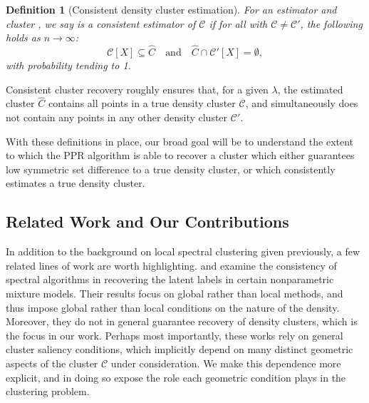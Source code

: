 \documentclass[11pt,twoside]{article}
\newtheorem{definition}{Definition}
\newcommand{\1}{\mathbf{1}}
\newcommand{\Xbf}{X}             %
\newcommand{\Cbb}{\mathbb{C}}
\newcommand{\Cset}{\mathcal{C}}
\newcommand{\Cest}{\widehat{C}}
\begin{document}
\begin{definition}[Consistent density cluster estimation]
  \label{def: consistent_density_cluster_estimation}
  For an estimator \smash{$\Cest \subseteq \Xbf$} and cluster 
  \smash{$\Cset \in \Cbb_f(\lambda)$}, we say \smash{$\Cest$} is a consistent 
  estimator of $\Cset$ if for all \smash{$\Cset' \in \Cbb_f(\lambda)$} with
  $\Cset \not= \Cset'$, the following holds as $n \to \infty$: 
  \begin{equation}
    \label{eqn: consistent_density_cluster_recovery}
    \Cset[\Xbf] \subseteq \Cest \quad \text{and} \quad
    \Cest \cap \Cset'[\Xbf] = \emptyset,
  \end{equation}
  with probability tending to 1.
\end{definition}
\noindent Consistent cluster recovery roughly ensures that, for a given $\lambda$, the estimated cluster $\Cest$ contains all
points in a true
density cluster $\Cset$, and simultaneously does not contain any points in any other density cluster $\Cset'$. 

With these definitions in place, our broad goal will be to understand the extent to which the PPR algorithm is able to
recover a cluster which either guarantees low symmetric set difference to a true density cluster, or which consistently estimates
a true density cluster.



\subsection{Related Work and Our Contributions}
In addition to the background on local spectral
clustering given previously, a few related lines of work are worth
highlighting. \citet{shi2009} and \citet{schiebinger2015} examine the consistency of  
spectral algorithms in recovering the latent labels in certain
nonparametric mixture models. Their results focus on global rather than local 
methods, and thus impose global rather than local conditions on the nature
of the density. Moreover, they do not in general guarantee recovery of density 
clusters, which is the focus in our work. Perhaps most importantly, these works
rely on general cluster saliency conditions, which implicitly depend on many
distinct geometric aspects of the cluster $\Cset$ under consideration. We make
this dependence more explicit, and in doing so expose the role each geometric
condition plays in the clustering problem. 
\end{document}
